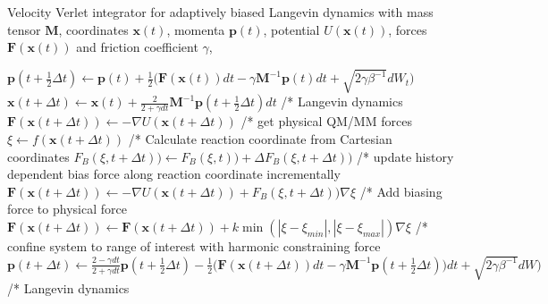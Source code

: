 \begin{algorithm}[H]
  \caption{Velocity Verlet integrator for adaptively biased Langevin dynamics with mass tensor $\textbf{M}$, coordinates $\textbf{x}(t)$, momenta $\textbf{p}(t)$, potential $U(\textbf{x}(t))$, forces $\textbf{F}(\textbf{x}(t))$ and friction coefficient $\gamma$,}
  \label{alg:ABM}
    \begin{algorithmic}
        \STATE
        \STATE $\textbf{p}(t+\frac{1}{2}\Delta t) \leftarrow \textbf{p}(t) + \frac{1}{2} \bigl(\textbf{F}(\textbf{x}(t))dt-\gamma \textbf{M}^{-1}\textbf{p}(t) dt + \sqrt{2\gamma\beta^{-1}}dW_t \bigr)$
        \STATE $\textbf{x}(t+\Delta t) \leftarrow \textbf{x}(t) + \frac{2}{2+\gamma dt}\textbf{M}^{-1} \textbf{p}(t+\frac{1}{2}\Delta t) dt$
        \STATE /* Langevin dynamics
        \STATE
        \STATE $\textbf{F}(\textbf{x}(t+\Delta t)) \leftarrow -\nabla U(\textbf{x}(t+\Delta t))$
        \STATE /* get physical QM/MM forces
        \STATE
        \STATE $\xi \leftarrow f(\textbf{x}(t+\Delta t))$
        \STATE /* Calculate reaction coordinate from Cartesian coordinates
        \STATE
          \STATE
          \STATE $F_{B}(\xi, t+\Delta t))\leftarrow F_{B}(\xi, t))+\Delta F_{B}(\xi,t+\Delta t))$
          \STATE /* update history dependent bias force along reaction coordinate incrementally
          \STATE
          \STATE $\textbf{F}(\textbf{x}(t+\Delta t)) \leftarrow -\nabla U(\textbf{x}(t+\Delta t)) + F_{B}(\xi, t+\Delta t))\nabla\xi$
          \STATE /* Add biasing force to physical force
          \STATE
        \ELSE
          \STATE
          \STATE $\textbf{F}(\textbf{x}(t+\Delta t)) \leftarrow \textbf{F}(\textbf{x}(t+\Delta t)) + k\min(|\xi-\xi_{min}|,|\xi-\xi_{max}|)\nabla\xi$
          \STATE /* confine system to range of interest with harmonic constraining force
          \STATE
        \ENDIF
        \STATE
        \STATE $\textbf{p}(t+\Delta t) \leftarrow \frac{2 - \gamma dt}{2+\gamma dt} \textbf{p}(t+\frac{1}{2}\Delta t) - \frac{1}{2} \bigl(\textbf{F}(\textbf{x}(t+\Delta t))dt-\gamma \textbf{M}^{-1}\textbf{p}(t+\frac{1}{2}\Delta t)) dt + \sqrt{2\gamma\beta^{-1}}dW\bigr)$
        \STATE /* Langevin dynamics
        \STATE
      \ENDWHILE
    \end{algorithmic}
\end{algorithm}

\newpage
